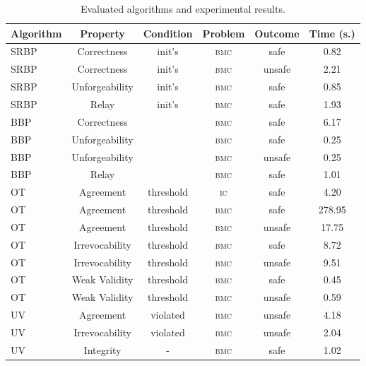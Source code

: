 \documentclass[11pt,a4paper]{article}
\begin{document}
{\begin{table}
\caption{\label{tabellone}Evaluated algorithms and experimental results.}
\centering
{\scriptsize
\begin{tabular}{|l|c|c|c|c|c|} \hline
\textbf{Algorithm} & \textbf{Property} & \textbf{Condition} & \textbf{Problem} & \textbf{Outcome} & \textbf{Time (s.)} \\ \hline
SRBP \cite{Srikanth87} & Correctness &  init's & \textsc{bmc} & safe & 0.82   \\ \hline
SRBP \cite{Srikanth87} & Correctness &  init's &  \textsc{bmc} & unsafe & 2.21  \\ \hline
SRBP \cite{Srikanth87} & Unforgeability &  init's & \textsc{bmc} & safe & 0.85  \\ \hline
SRBP \cite{Srikanth87} & Relay &  init's & \textsc{bmc} & safe & 1.93   \\ \hline
BBP \cite{toueg87} & Correctness &  & \textsc{bmc} & safe & 6.17  \\ \hline
BBP \cite{toueg87} & Unforgeability &  & \textsc{bmc} & safe & 0.25  \\ \hline
BBP \cite{toueg87} & Unforgeability &  & \textsc{bmc} & unsafe & 0.25 \\ \hline
BBP \cite{toueg87} & Relay &  & \textsc{bmc} & safe & 1.01  \\ \hline
OT \cite{sharpie} & Agreement & threshold  & \textsc{ic} & safe & 4.20 \\ \hline
OT \cite{sharpie} & Agreement & threshold  & \textsc{bmc} & safe & 278.95  \\ \hline
OT \cite{sharpie} & Agreement & threshold  & \textsc{bmc} & unsafe & 17.75  \\ \hline
OT \cite{sharpie} & Irrevocability & threshold  & \textsc{bmc} & safe & 8.72  \\ \hline
OT \cite{sharpie} & Irrevocability & threshold  & \textsc{bmc} & unsafe & 9.51  \\ \hline
OT \cite{sharpie} & Weak Validity & threshold  & \textsc{bmc} & safe & 0.45  \\ \hline
OT \cite{sharpie} & Weak Validity & threshold  & \textsc{bmc} & unsafe & 0.59  \\ \hline
UV \cite{heardof} & Agreement &  violated & \textsc{bmc} & unsafe & 4.18  \\ \hline
UV \cite{heardof} & Irrevocability &  violated & \textsc{bmc} & unsafe & 2.04  \\ \hline
UV \cite{heardof} & Integrity & - & \textsc{bmc} & safe & 1.02 \\ \hline

\end{tabular}}
\end{table}}
\end{document}
